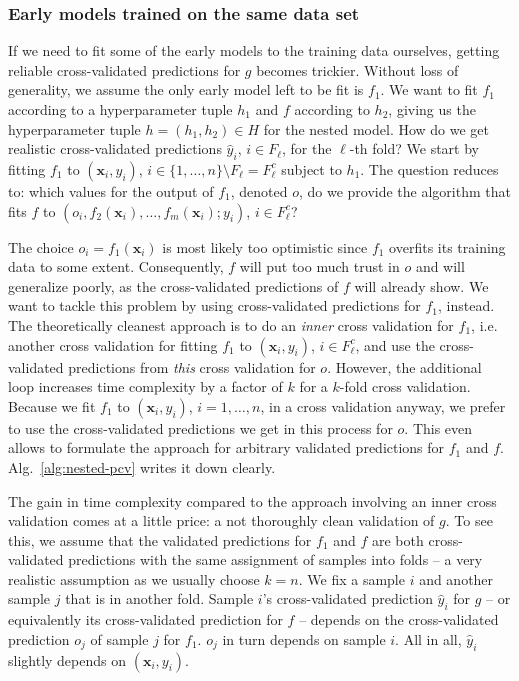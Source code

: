 \subsubsection{Early models trained on the same data set}
If we need to fit some of the early models to the training data ourselves, getting reliable 
cross-validated predictions
for $g$ becomes trickier. Without loss of generality, we assume the only early model left to be 
fit 
is $f_1$. We want to fit $f_1$ according to a hyperparameter tuple $h_1$ and $f$ according to $h_2$, 
giving us the hyperparameter tuple $h = (h_1, h_2) \in H$ for the nested model. How do 
we get realistic cross-validated predictions $\hat{y}_i$, $i \in F_\ell$, for the $\ell$-th fold? 
We start by fitting $f_1$ to $(\mathbf{x}_i, y_i)$, $i \in \{ 1, \ldots, n \} \setminus F_\ell = F_\ell^c$ 
subject to $h_1$.
The question reduces to: which values for the output of $f_1$, denoted $o$, do we provide the 
algorithm that fits $f$ to $(o_i, f_2(\mathbf{x}_i), \dots, f_m(\mathbf{x}_i); y_i)$, $i \in 
F_\ell^c$?

The choice $o_i = f_1(\mathbf{x}_i)$ is most likely too optimistic since $f_1$ overfits its training 
data to some extent. Consequently, $f$ will put too much trust in $o$ and will generalize poorly, 
as the cross-validated predictions of $f$ will already show. We want to tackle this problem by 
using cross-validated predictions for $f_1$, instead. The theoretically cleanest approach 
is to do an \textit{inner} cross validation for $f_1$, i.e. another cross validation for fitting 
$f_1$ to $(\mathbf{x}_i, y_i)$, $i \in F_\ell^c$, and use the cross-validated predictions from \textit{this} 
cross validation for $o$. However, the additional loop increases time complexity by a factor of $k$ 
for a $k$-fold cross validation. Because we fit $f_1$ to $(\mathbf{x}_i, y_i)$, $i = 1, \ldots, n$, 
in a cross validation anyway, we prefer to use the cross-validated predictions we get in this 
process for $o$. This even allows to formulate the approach for arbitrary validated predictions 
for $f_1$ and $f$. Alg.\ \ref{alg:nested-pcv} writes it down clearly.



The gain in time complexity compared to the approach involving an inner cross validation comes at a 
little price: a not thoroughly clean validation of $g$. To see this, we assume that the validated 
predictions for $f_1$ and $f$ are both cross-validated predictions with the same
assignment of samples into folds -- a very 
realistic assumption as we 
usually choose $k = n$. We fix a sample $i$ and another sample $j$ that is in another fold. 
Sample $i$'s cross-validated prediction $\hat{y}_i$ for $g$ -- or equivalently its cross-validated 
prediction for $f$ -- depends on the cross-validated 
prediction $o_j$ of sample $j$ for $f_1$. $o_j$ in turn depends on sample 
$i$. All in all, $\hat{y}_i$ slightly depends on $(\mathbf{x}_i, y_i)$.

